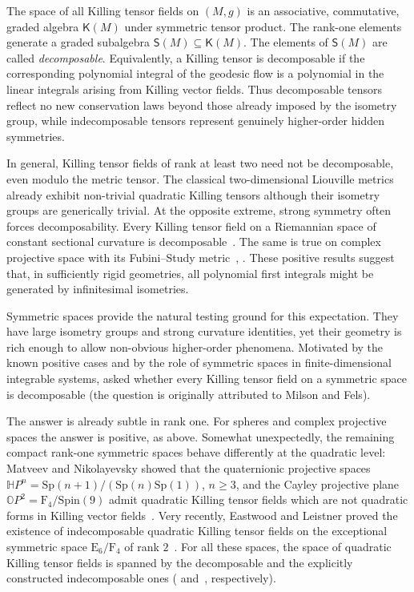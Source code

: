 \documentclass[12pt,reqno]{amsart}
\newcommand \bh{\mathbb{H}}
\newcommand \bo{\mathbb{O}}
\newcommand \Sp{\mathrm{Sp}}
\newcommand \Ff{\mathrm{F}_4}
\newcommand \Spin{\mathrm{Spin}}
\newcommand \sK{\mathsf{K}}
\newcommand \sS{\mathsf{S}}
\newcommand \<{\langle}
\renewcommand \>{\rangle}
\theoremstyle{definition}
\theoremstyle{remark}
\begin{document}
	The space of all Killing tensor fields on $(M,g)$ is an associative, commutative, graded algebra $\sK(M)$ under symmetric tensor product. The rank-one elements generate a graded subalgebra $\sS(M)\subseteq \sK(M)$. The elements of $\sS(M)$ are called \emph{decomposable}.  Equivalently, a Killing tensor is decomposable if the corresponding polynomial integral of the geodesic flow is a polynomial in the linear integrals arising from Killing vector fields. Thus decomposable tensors reflect no new conservation laws beyond those already imposed by the isometry group, while indecomposable tensors represent genuinely higher-order hidden symmetries.
	
	In general, Killing tensor fields of rank at least two need not be decomposable, even modulo the metric tensor. The classical two-dimensional Liouville metrics already exhibit non-trivial quadratic Killing tensors although their isometry groups are generically trivial. At the opposite extreme, strong symmetry often forces decomposability. Every Killing tensor field on a Riemannian space of constant sectional curvature is decomposable~\cite{Tho,ST1,Tak}. The same is true on complex projective space with its Fubini--Study metric~\cite[Corollary~5]{East}, \cite[Theorem~2.2]{ST2}. These positive results suggest that, in sufficiently rigid geometries, all polynomial first integrals might be generated by infinitesimal isometries.
	
	Symmetric spaces provide the natural testing ground for this expectation. They have large isometry groups and strong curvature identities, yet their geometry is rich enough to allow non-obvious higher-order phenomena. Motivated by the known positive cases and by the role of symmetric spaces in finite-dimensional integrable systems, \cite[Question~3.9]{BMMT} asked whether every Killing tensor field on a symmetric space is decomposable (the question is originally attributed  to Milson and Fels).
	
	The answer is already subtle in rank one.  For spheres and complex projective spaces the answer is positive, as above. Somewhat unexpectedly, the remaining compact rank-one symmetric spaces behave differently at the quadratic level: Matveev and Nikolayevsky showed that the quaternionic projective spaces $\bh P^n=\Sp(n+1)/(\Sp(n)\Sp(1))$, $n\geq 3$, and the Cayley projective plane $\bo P^2=\Ff/\Spin(9)$ admit quadratic Killing tensor fields which are not quadratic forms in Killing vector fields~\cite{MN1}. Very recently, Eastwood and Leistner proved the existence of indecomposable quadratic Killing tensor fields on the exceptional symmetric space $\mathrm{E}_6/\Ff$ of rank $2$~\cite[Theorem~16]{EL}. For all these spaces, the space of quadratic Killing tensor fields is spanned by the decomposable and the explicitly constructed indecomposable ones (\cite[Theorem~4]{MN2} and~\cite[Theorem~17]{EL}, respectively).
	
\end{document}
